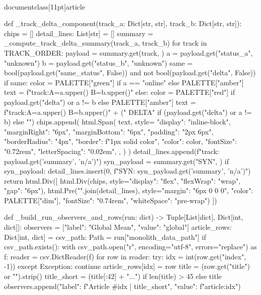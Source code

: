 \\documentclass[11pt]{article}
\begin{document}
\begin{CodeBlock}
{def _track_delta_component(track_a: Dict[str, str], track_b: Dict[str, str]):
    chips = []
    detail_lines: List[str] = []
    summary = _compute_track_delta_summary(track_a, track_b)
    for track in TRACK_ORDER:
        payload = summary.get(track, {})
        a = payload.get("status_a", "unknown")
        b = payload.get("status_b", "unknown")
        same = bool(payload.get("same_status", False)) and not bool(payload.get("delta", False))
        if same:
            color = PALETTE["green"] if a == "online" else PALETTE["amber"]
            text = f"{track}:A={a.upper()} B={b.upper()}"
        else:
            color = PALETTE["red"] if payload.get("delta") or a != b else PALETTE["amber"]
            text = f"{track}:A={a.upper()} B={b.upper()}" + (" DELTA" if (payload.get("delta") or a != b) else "")
        chips.append(
            html.Span(
                text,
                style={
                    "display": "inline-block",
                    "marginRight": "6px",
                    "marginBottom": "6px",
                    "padding": "2px 6px",
                    "borderRadius": "4px",
                    "border": f"1px solid {color}",
                    "color": color,
                    "fontSize": "0.72rem",
                    "letterSpacing": "0.02em",
                },
            )
        )
        detail_lines.append(f"{track}: {payload.get('summary', 'n/a')}")
    syn_payload = summary.get("SYN", {})
    if syn_payload:
        detail_lines.insert(0, f"SYN: {syn_payload.get('summary', 'n/a')}")
    return html.Div([
        html.Div(chips, style={"display": "flex", "flexWrap": "wrap", "gap": "6px"}),
        html.Pre("\n".join(detail_lines), style={"margin": "6px 0 0 0", "color": PALETTE["dim"], "fontSize": "0.74rem", "whiteSpace": "pre-wrap"})
    ])


def _build_run_observers_and_rows(run: dict) -> Tuple[List[dict], Dict[int, dict]]:
    observers = [{"label": "Global Mean", "value": "global"}]
    article_rows: Dict[int, dict] = {}
    csv_path: Path = run["monolith_data_path"]
    if csv_path.exists():
        with csv_path.open("r", encoding="utf-8", errors="replace") as f:
            reader = csv.DictReader(f)
            for row in reader:
                try:
                    idx = int(row.get("index", -1))
                except Exception:
                    continue
                article_rows[idx] = row
                title = (row.get("title") or "").strip()
                title_short = (title[:42] + "...") if len(title) > 45 else title
                observers.append({"label": f"Article #{idx} | {title_short}", "value": f"article:{idx}"})

}
\end{CodeBlock}
\end{document}
